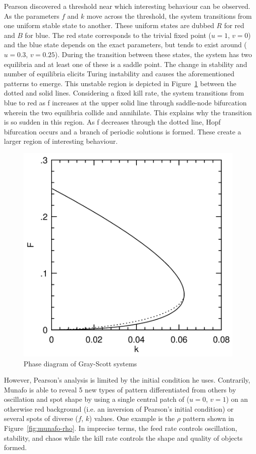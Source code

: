 Pearson discovered a threshold near which interesting behaviour can be observed. As the parameters $f$ and $k$ move across the threshold, the system transitions from one uniform stable state to another. These uniform states are dubbed $R$ for red and $B$ for blue. The red state corresponds to the trivial fixed point ($u = 1$, $v = 0$) and the blue state depends on the exact parameters, but tends to exist around ($u = 0.3$, $v = 0.25$). During the transition between these states, the system has two equilibria and at least one of these is a saddle point. The change in stability and number of equilibria elicits Turing instability and causes the aforementioned patterns to emerge. This unstable region is depicted in Figure~\ref{fig:pearsons-threshold} between the dotted and solid lines. Considering a fixed kill rate, the system transitions from blue to red as f increases at the upper solid line through saddle-node bifurcation wherein the two equilibria collide and annihilate. This explains why the transition is so sudden in this region. As f decreases through the dotted line, Hopf bifurcation occurs and a branch of periodic solutions is formed. These create a larger region of interesting behaviour.\\

\begin{figure}[!h]
\centering
\includegraphics[width=.45\textwidth]{images/pearson-threshold.png}
\caption{Phase diagram of Gray-Scott systems\cite{pearson1993complex}}
\label{fig:pearsons-threshold}
\end{figure}

However, Pearson's analysis is limited by the initial condition he uses. Contrarily, Munafo\cite{munafo2014stable} is able to reveal 5 new types of pattern differentiated from others by oscillation and spot shape by using a single central patch of ($u = 0$, $v=1$) on an otherwise red background (i.e. an inversion of Pearson's initial condition) or several spots of diverse ($f$, $k$) values. One example is the $\rho$ pattern shown in Figure~\ref{fig:munafo-rho}. In imprecise terms, the feed rate controls oscillation, stability, and chaos while the kill rate controls the shape and quality of objects formed.\\

